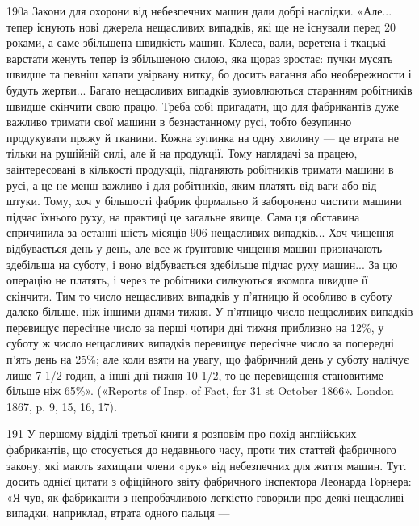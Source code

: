 190а Закони для охорони від небезпечних машин дали добрі наслідки.
«Але... тепер існують нові джерела нещасливих випадків, які ще не існували
перед 20 роками, а саме збільшена швидкість машин. Колеса, вали,
веретена і ткацькі варстати женуть тепер із збільшеною силою, яка щораз
зростає: пучки мусять швидше та певніш хапати увірвану нитку, бо
досить вагання або необережности і будуть жертви... Багато нещасливих
випадків зумовлюються старанням робітників швидше скінчити свою
працю. Треба собі пригадати, що для фабрикантів дуже важливо тримати
свої машини в безнастанному русі, тобто безупинно продукувати пряжу й
тканини. Кожна зупинка на одну хвилину — це втрата не тільки на рушійній
силі, але й на продукції. Тому наглядачі за працею, заінтересовані
в кількості продукції, підганяють робітників тримати машини в русі,
а це не менш важливо і для робітників, яким платять від ваги або від
штуки. Тому, хоч у більшості фабрик формально й заборонено чистити
машини підчас їхнього руху, на практиці це загальне явище. Сама ця
обставина спричинила за останні шість місяців 906 нещасливих випадків...
Хоч чищення відбувається день-у-день, але все ж ґрунтовне чищення
машин призначають здебільша на суботу, і воно відбувається здебільше
підчас руху машин... За цю операцію не платять, і через те робітники
силкуються якомога швидше її скінчити. Тим то число нещасливих
випадків у п’ятницю й особливо в суботу далеко більше, ніж іншими
днями тижня. У п’ятницю число нещасливих випадків перевищує пересічне
число за перші чотири дні тижня приблизно на 12\%, у суботу ж
число нещасливих випадків перевищує пересічне число за попередні
п’ять день на 25\%; але коли взяти на увагу, що фабричний день у суботу
налічує лише 7 1/2 годин, а інші дні тижня 10 1/2, то це перевищення становитиме
більше ніж 65\%». («Reports of Insp. of Fact, for 31 st October 1866».
London 1867, p. 9, 15, 16, 17).

191 У першому відділі третьої книги я розповім про похід англійських
фабрикантів, що стосується до недавнього часу, проти тих статтей фабричного
закону, які мають захищати члени «рук» від небезпечних для життя
машин. Тут. досить однієї цитати з офіційного звіту фабричного інспектора
Леонарда Горнера: «Я чув, як фабриканти з непробачливою легкістю
говорили про деякі нещасливі випадки, наприклад, втрата одного пальця —
